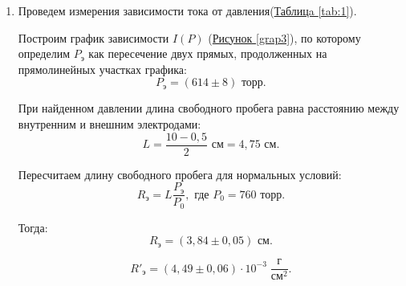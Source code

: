 \documentclass{article}
\begin{document}
	
	\begin{enumerate}
		\item Проведем измерения зависимости тока от давления(\hyperref[tab:1]{Таблицa \ref*{tab:1}}).

  
		Построим график зависимости $I(P)$ (\hyperref[grap3]{Рисунок \ref*{grap3}}), по которому определим $P_\text{э}$ как пересечение двух прямых, продолженных на прямолинейных участках графика:
		\begin{equation*}
			P_\text{э} = (614 \pm 8) \text{ торр}.
		\end{equation*}
	
		При найденном давлении длина свободного пробега равна расстоянию между внутренним и внешним электродами:
		\begin{equation*}
			L = \frac{10-0,5}{2} \text{ см} = 4,75 \text{ см}.
		\end{equation*}
	
		Пересчитаем длину свободного пробега для нормальных условий:
		\begin{equation*}
			R_\text{э} = L\frac{P_\text{э}}{P_0}, \text{ где } P_0 = 760 \text{ торр}.
		\end{equation*}
		
		Тогда:
		\begin{equation*}
			R_\text{э} = (3,84 \pm 0,05) \text{ см}.
		\end{equation*}	
	
		\begin{equation*}
			R'_\text{э} = (4,49 \pm 0,06) \cdot 10^{-3} \;\dfrac{\text{г}}{\text{см}^2}.
		\end{equation*}		
	


\end{enumerate}
\end{document}

